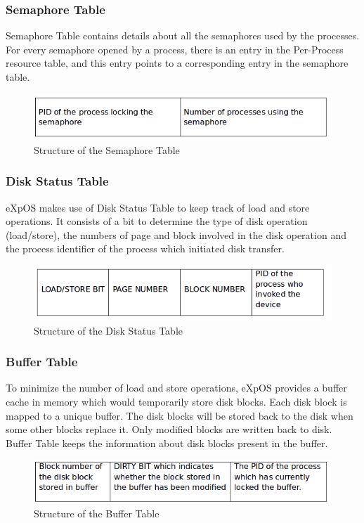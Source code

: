 \documentclass[11pt ,twosided]{article}
\begin{document}
\subsubsection{Semaphore Table}

Semaphore Table contains details about all the semaphores used by the processes. For every semaphore opened by a process, there is an entry in the Per-Process resource table,  and this entry points to a corresponding entry in the semaphore table.
\begin{figure}[ht]
\centering
\includegraphics[scale=0.60]{Semaphore_Table.png}
\caption{\footnotesize Structure of the Semaphore Table}
\label{fig_6}
\end{figure}
\subsubsection{Disk Status Table}

eXpOS makes use of Disk Status Table to keep track of load and store operations. It consists of a bit to determine the type of disk operation (load/store), the numbers of page and block involved in the disk operation and the process identifier of the process which initiated disk transfer.
\begin{figure}[ht]
\centering
\includegraphics[scale=0.60]{Disk_Status.png}
\caption{\footnotesize Structure of the Disk Status Table}
\label{fig_7}
\end{figure}
\subsubsection{Buffer Table}

To minimize the number of load and store operations, eXpOS provides a buffer cache in memory which would temporarily store disk blocks. Each disk block is mapped to a unique buffer. The disk blocks will be stored back to the disk when some other blocks replace it. Only modified blocks are written back to disk.
Buffer Table keeps the information about disk blocks present in the buffer.
\begin{figure}[ht]
\centering
\includegraphics[scale=0.60]{Buffer_table.png}
\caption{\footnotesize Structure of the Buffer Table}
\label{fig_8}
\end{figure}
\end{document}
